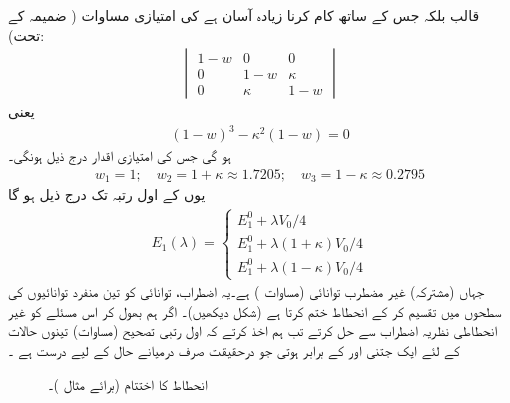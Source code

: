 قالب  بلکہ  جس کے ساتھ کام کرنا زیادہ آسان ہے کی امتیازی مساوات ( ضمیمہ  کے تحت):
\begin{align*}
\begin{vmatrix}
1 - w & 0 & 0 \\
0 & 1 - w& \kappa \\
0 & \kappa & 1 - w
\end{vmatrix}
\end{align*}
یعنی
\begin{align*}
(1 - w)^3 - \kappa^2 (1 - w) = 0
\end{align*}
ہو گی جس کی  امتیازی اقدار درج ذیل ہونگی۔ 
\begin{align*}
w_1 = 1; \quad w_2 = 1+ \kappa \approx 1.7205; \quad w_3 = 1 - \kappa \approx 0.2795
\end{align*}
یوں  کے اول رتبہ تک درج ذیل ہو گا 
\begin{align}
E_1 (\lambda) = 
\begin{cases}
E_1^0 + \lambda V_0/4 \\
E_1^0 + \lambda (1+ \kappa) V_0 /4 \\
E_1^0 + \lambda (1 - \kappa) V_0 /4
\end{cases}
\end{align}
جہاں  (مشترکہ)  غیر مضطرب توانائی (مساوات )  ہے۔یہ   اضطراب،  توانائی  کو تین منفرد توانائیوں کی سطحوں میں تقسیم کر کے انحطاط ختم  کرتا ہے  (شکل  دیکھیں)۔   اگر ہم بھول کر  اس مسئلے کو غیر انحطاطی نظریہ اضطراب سے حل کرتے تب ہم اخذ کرتے کہ اول رتبی تصحیح (مساوات)   تینوں حالات کے لئے ایک جتنی   اور   کے برابر ہوتی جو درحقیقت صرف درمیانے حال کے لیے درست ہے ۔

\begin{figure}
\centering
{}
\caption{انحطاط کا اختتام (برائے مثال )۔}
\label{شکل_غیر_تابع_اضطراب_انحطاط_اختتام_مثال}
\end{figure}


